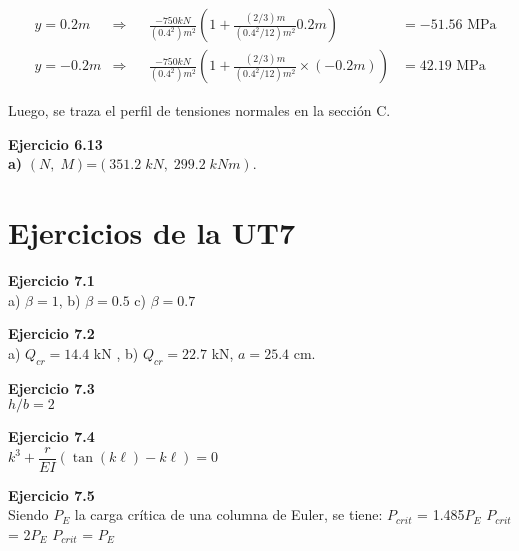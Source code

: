 \begin{align*}
&	y = 0.2m  &\Rightarrow && \frac{-750kN}{(0.4^2)m^2} \left ( 1 + \frac{(2/3)m}{(0.4^2/12)m^2} 0.2m \right )& = -51.56 \text{ MPa}\\
&	y =-0.2m  &\Rightarrow && \frac{-750kN}{(0.4^2)m^2} \left ( 1 + \frac{(2/3)m}{(0.4^2/12)m^2} \times (-0.2m) \right )&= 42.19 \text{ MPa}
\end{align*}

Luego, se traza el perfil de tensiones normales en la sección C.


\begin{center}
	\def\svgwidth{0.5\textwidth}
	
\end{center}

\textbf{Ejercicio 6.13}\\

\textbf{a)}  $(N,\;M)$=$(351.2\;kN,\;299.2\;kNm)$.


\section{Ejercicios de la UT7} 

\textbf{Ejercicio 7.1}\\

a) $\beta = 1$, b) $\beta = 0.5$ c) $\beta = 0.7$\newline

\textbf{Ejercicio 7.2}\\

a) $Q_{cr} = 14.4 $ kN ,  b) $Q_{cr} = 22.7 $ kN, $a=25.4$ cm.\newline



\textbf{Ejercicio 7.3}\\

\indent $h/b = 2$\newline

\textbf{Ejercicio 7.4}\\

\indent $k^3 + \dfrac{r}{EI} \left( \tan(k\ell)-k\ell \right) = 0 $\newline

\textbf{Ejercicio 7.5}\\

\indent Siendo $P_E$ la carga crítica de una columna de Euler, se tiene:
\indent \parte $P_{crit}$ = 1.485$P_E$
\indent \parte $P_{crit}$ = 2$P_E$
\indent \parte $P_{crit}$ = $P_E$

